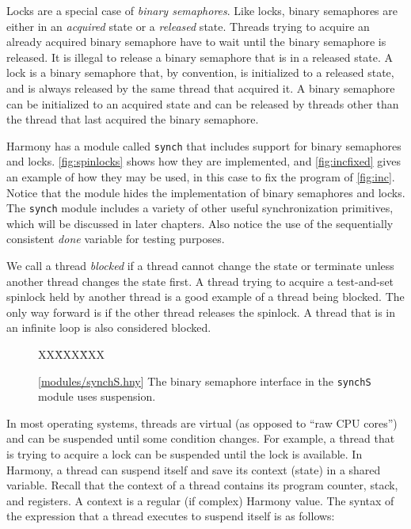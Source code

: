\documentclass{report}
\newcommand{\harmonysource}[1]{
\begin{tabbing}
XX\=XXX\=XXX\kill
    
\end{tabbing}
}
\newcommand{\harmonylink}[1]{%
[\href{https://harmony.cs.cornell.edu/#1}{\underline{#1}}]%
}
\newenvironment{code}{
\tcolorbox
}{
\endtcolorbox
}
\begin{document}
Locks are a special case of \emph{binary semaphores}.
Like locks, binary semaphores are either in an \emph{acquired} state
or a \emph{released} state.
Threads trying to acquire an already acquired binary semaphore
have to wait until the binary semaphore is released.
It is illegal to release a binary semaphore that is in a released
state.
A lock is a binary semaphore that, by convention, is initialized to a
released state, and is always released by the same thread that acquired it.
A binary semaphore can be initialized to an acquired state and can be
released by threads other than the thread that last acquired the
binary semaphore.

Harmony has a module called \texttt{synch} that includes support for
binary semaphores and locks.
\autoref{fig:spinlocks} shows how they are implemented, and
\autoref{fig:incfixed} gives an example of how they may be used,
in this case to fix the program of \autoref{fig:inc}.
Notice that the module hides the implementation of
binary semaphores and locks.
The \texttt{synch} module includes a variety of other useful
synchronization primitives, which will be discussed in later
chapters.
Also notice the use of the sequentially consistent \textit{done}
variable for testing purposes.

%

We call a thread \emph{blocked}
%
if a thread cannot change the state or terminate unless
another thread changes the state first.
A thread trying to
acquire a test-and-set spinlock held by another thread is a good example
of a thread being blocked.
The only way forward is if the other thread releases the spinlock.
A thread that is in an infinite loop is also considered blocked.

\begin{figure}
\begin{code}
\harmonysource{locksusp}
\end{code}
\caption{\harmonylink{modules/synchS.hny} The binary semaphore interface in the \texttt{synchS} module uses suspension.}
\label{fig:suspension}
\end{figure}

In most operating systems, threads are virtual (as opposed to ``raw CPU cores'')
and can be suspended until some condition changes.
For example, a thread that is trying to acquire a lock can be suspended until the lock is
available.
In Harmony, a thread can suspend itself and save its context (state) in a
shared variable.  Recall that the context of a thread contains
its program counter, stack, and registers.
A context is a regular (if complex) Harmony value.
The syntax of the expression that a thread executes to suspend itself
is as follows:
\end{document}
